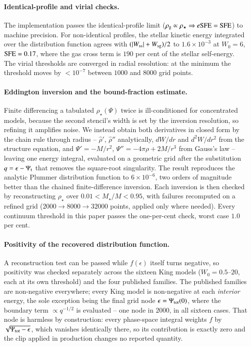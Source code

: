 \documentclass{aa}
\newcommand{\esfe}{e{\rm SFE}}
\newcommand{\sfe}{{\rm SFE}}
\begin{document}
\paragraph{Identical-profile and virial checks.}
The implementation passes the identical-profile limit
($\rho_{\rm g}\propto\rho_\star\Rightarrow\esfe=\sfe$) to machine
precision. For non-identical profiles, the stellar kinetic energy
integrated over the distribution function agrees with
$(|W_{\rm ss}|+W_{\rm sg})/2$ to $1.6\times10^{-3}$ at $W_0=6$,
$\sfe=0.17$, where the gas cross term is $190$ per cent of the stellar
self-energy. The virial thresholds are converged in radial resolution: at
the minimum the threshold moves by $<10^{-7}$ between $1000$ and $8000$
grid points.

\paragraph{Eddington inversion and the bound-fraction estimate.}
Finite differencing a tabulated $\rho_\star(\Psi)$ twice is
ill-conditioned for concentrated models, because the second stencil's
width is set by the inversion resolution, so refining it amplifies noise.
We instead obtain both derivatives in closed form by the chain rule
through radius -- $\hat\rho'$, $\hat\rho''$ analytically, $dW/dr$ and
$d^2W/dr^2$ from the structure equation, and $\Psi'=-M/r^2$,
$\Psi''=-4\pi\rho+2M/r^3$ from Gauss's law -- leaving one energy integral,
evaluated on a geometric grid after the substitution
$q=\epsilon-\Psi_{\rm t}$ that removes the square-root singularity. The
result reproduces the analytic Plummer distribution function to
$6\times10^{-6}$, two orders of magnitude better than the chained
finite-difference inversion. Each inversion is then checked by
reconstructing $\rho_\star$ over $0.01<M_\star/M<0.95$, with failures
recomputed on a refined grid ($2000\rightarrow8000\rightarrow32000$
points, applied only where needed). Every continuum threshold in this
paper passes the one-per-cent check, worst case $1.0$ per cent.

\paragraph{Positivity of the recovered distribution function.}
A reconstruction test can be passed while $f(\epsilon)$ itself turns
negative, so positivity was checked separately across the sixteen King
models ($W_0=0.5$--$20$, each at its own threshold) and the four
published families. The published families are non-negative everywhere;
every King model is non-negative at each \emph{interior} energy, the sole
exception being the final grid node $\epsilon=\Psi_{\rm tot}(0)$, where
the boundary term $\propto q^{-1/2}$ is evaluated -- one node in $2000$,
in all sixteen cases. That node is harmless by construction: every
phase-space integral weights $f$ by $\sqrt{\Psi_{\rm tot}-\epsilon}$,
which vanishes identically there, so its contribution is exactly zero and
the clip applied in production changes no reported quantity.
\end{document}

